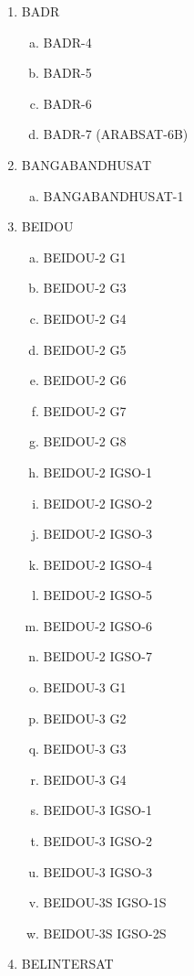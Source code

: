 \begin{multicols}{2}
\begin{enumerate}
  \begin{enumerate}[a.]
    \item AZERSPACE 1
    \item AZERSPACE 2 (IS-38)
  \end{enumerate}
  \item BADR
  \begin{enumerate}[a.]
    \item BADR-4
    \item BADR-5
    \item BADR-6
    \item BADR-7 (ARABSAT-6B)
  \end{enumerate}
  \item BANGABANDHUSAT
  \begin{enumerate}[a.]
    \item BANGABANDHUSAT-1
  \end{enumerate}
  \item BEIDOU
  \begin{enumerate}[a.]
    \item BEIDOU-2 G1
    \item BEIDOU-2 G3
    \item BEIDOU-2 G4
    \item BEIDOU-2 G5
    \item BEIDOU-2 G6
    \item BEIDOU-2 G7
    \item BEIDOU-2 G8
    \item BEIDOU-2 IGSO-1
    \item BEIDOU-2 IGSO-2
    \item BEIDOU-2 IGSO-3
    \item BEIDOU-2 IGSO-4
    \item BEIDOU-2 IGSO-5
    \item BEIDOU-2 IGSO-6
    \item BEIDOU-2 IGSO-7
    \item BEIDOU-3 G1
    \item BEIDOU-3 G2
    \item BEIDOU-3 G3
    \item BEIDOU-3 G4
    \item BEIDOU-3 IGSO-1
    \item BEIDOU-3 IGSO-2
    \item BEIDOU-3 IGSO-3
    \item BEIDOU-3S IGSO-1S
    \item BEIDOU-3S IGSO-2S
  \end{enumerate}
  \item BELINTERSAT

\end{enumerate}
\end{multicols}
